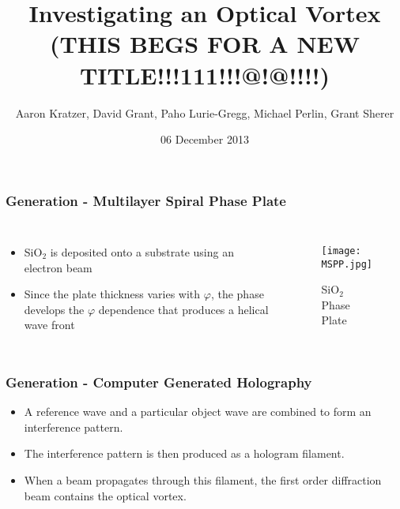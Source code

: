 \documentclass[xcolor=dvipsnames]{beamer}
\title{Investigating an Optical Vortex (THIS BEGS FOR A NEW TITLE!!!111!!!@!@!!!!)}
\author{Aaron Kratzer, David Grant, Paho Lurie-Gregg,
  Michael Perlin, Grant Sherer}
\date{06 December 2013}
\newenvironment{items}[1][]
{\begin{itemize}
    \ifthenelse{\isempty{#1}}
    {\setlength{\itemsep}{12pt}}{\setlength{\itemsep}{#1}}}
  {\end{itemize}}
\renewcommand{\phi}{\varphi} %
\begin{document}
\begin{frame}
  \maketitle
\end{frame}

\begin{frame}
	\frametitle{Generation - Multilayer Spiral Phase Plate}
  \begin{columns}[c]
    \column{2.5in}
    \begin{items}
    \item SiO$_2$ is deposited onto a substrate using an electron beam
    \item Since the plate thickness varies with $\phi$, the phase
      develops the $\phi$ dependence that produces a helical wave
      front
    \end{items}
    \column{2in}
    \begin{figure}
      \texttt{[image: MSPP.jpg]}
      \caption{SiO$_2$ Phase Plate}
      \label{MSPP}
    \end{figure}
  \end{columns}
\end{frame}

\begin{frame}
	\frametitle{Generation - Computer Generated Holography}
  \begin{items}
  \item A reference wave and a particular object wave are combined to
    form an interference pattern.
  \item The interference pattern is then produced as a hologram
    filament.
  \item When a beam propagates through this filament, the first order
    diffraction beam contains the optical vortex.
  \end{items}
\end{frame}


\end{document}

